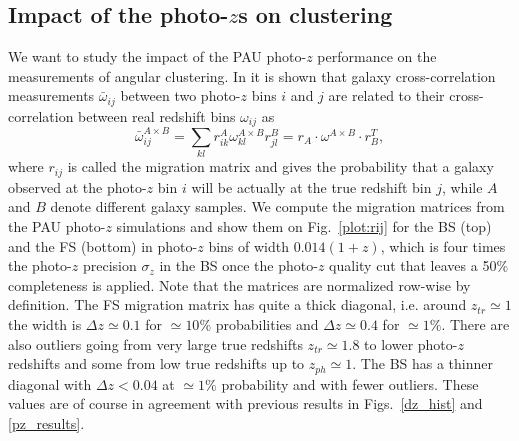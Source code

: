 \subsection{Impact of the photo-$z$s on clustering}
We want to study the impact of the PAU photo-$z$ performance on the measurements of angular clustering. In \citet{Gaztanaga2012} it is shown that galaxy cross-correlation measurements $\bar{\omega}_{ij}$ between two photo-$z$ bins $i$ and $j$ are related to their cross-correlation between real redshift bins $\omega_{ij}$ as
\begin{equation}
\bar{\omega}^{A\times B}_{ij} = \sum_{kl} r^A_{ik} \omega^{A \times B}_{kl} r^B_{jl} = r_A \cdot \omega^{A \times B} \cdot  r^T_B,
\label{eq:wijbar}
\end{equation}
where $r_{ij}$ is called the migration matrix and gives the probability that a galaxy observed at the photo-$z$ bin $i$ will be actually at the true redshift bin $j$, while $A$ and $B$ denote different galaxy samples. We compute the migration matrices from the PAU photo-$z$ simulations and show them on Fig.~\ref{plot:rij} for the BS (top) and the FS (bottom) in photo-$z$ bins of width $0.014(1+z)$, which is four times the photo-$z$ precision $\sigma_z$ in the BS once the photo-$z$ quality cut that leaves a 50\% completeness is applied. Note that the matrices are normalized row-wise by definition. The FS migration matrix has quite a  thick diagonal, i.e. around $z_{tr} \simeq 1$ the width is $\Delta z \simeq 0.1$ for $\simeq 10\%$ probabilities and $\Delta z \simeq 0.4$ for $\simeq 1\%$. There are also outliers going from very large true redshifts 
$z_{tr} \simeq 1.8$ to lower photo-$z$ redshifts and some from low true redshifts up to  $z_{ph} \simeq 1$. The  BS has a 
thinner diagonal with $\Delta z < 0.04$ at $\simeq 1\%$ probability and with fewer outliers.
These values are of course in agreement with previous results in Figs.~\ref{dz_hist} and \ref{pz_results}.

